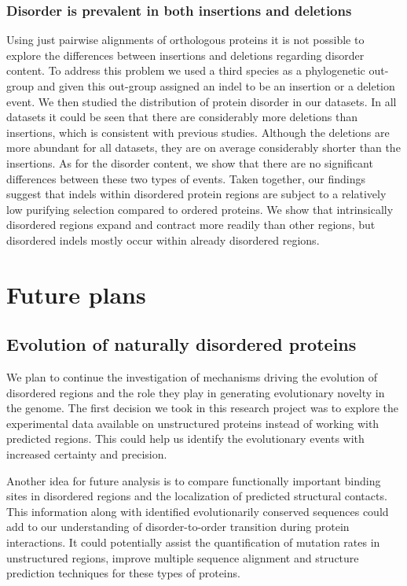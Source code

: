 \documentclass[11pt, a4paper,oneside]{report}
\newcommand{\mychapter}[2]{
    \setcounter{chapter}{#1}
    \setcounter{section}{0}
    \chapter*{#2}
    \addcontentsline{toc}{chapter}{#2}
}
\begin{document}
\subsection{Disorder is prevalent in both insertions and deletions}
Using just pairwise alignments of orthologous proteins it is not possible to explore the differences between insertions and deletions regarding disorder content. To address this problem we used a third species as a phylogenetic out-group and given this out-group assigned an indel to be an insertion or a deletion event. We then studied the distribution of protein disorder in our datasets. In all datasets it could be seen that there are considerably more deletions than insertions, which is consistent with previous studies. Although the deletions are more abundant for all datasets, they are on average considerably shorter than the insertions. As for the disorder content, we show that there are no significant differences between these two types of events. 
Taken together, our findings suggest that indels within disordered protein regions are subject to a relatively low purifying selection compared to ordered proteins. We show that intrinsically disordered regions expand and contract more readily than other regions, but disordered indels mostly occur within already disordered regions. 

\mychapter{4}{Future plans}
\section{Evolution of naturally disordered proteins}
We plan to continue the investigation of mechanisms driving the evolution of disordered regions and the role they play in generating evolutionary novelty in the genome. The first decision we took in this research project was to explore the experimental data available on unstructured proteins instead of working with predicted regions. This could help us identify the evolutionary events with increased certainty and precision. 

Another idea for future analysis is to compare functionally important binding sites in disordered regions and the localization of predicted  structural contacts. This information along with identified evolutionarily conserved sequences could add to our understanding of disorder-to-order transition during protein interactions. It could potentially assist the quantification of mutation rates in unstructured regions, improve multiple sequence alignment and structure prediction techniques for these types of proteins.  
\end{document}
